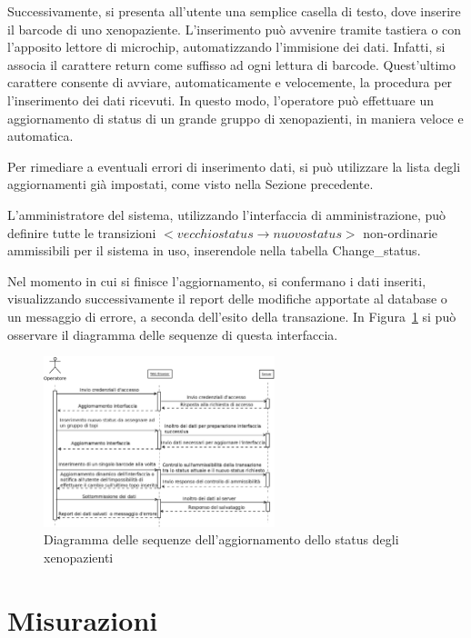 Successivamente, si presenta all'utente una semplice casella di testo, dove inserire il barcode di uno xenopaziente. L'inserimento pu\`o avvenire tramite tastiera o con l'apposito lettore di microchip, automatizzando l'immisione dei dati. Infatti, si associa il carattere return come suffisso ad ogni lettura di barcode. Quest'ultimo carattere consente di avviare, automaticamente e velocemente, la procedura per l'inserimento dei dati ricevuti. In questo modo, l'operatore pu\`o effettuare un aggiornamento di status di un grande gruppo di xenopazienti, in maniera veloce e automatica.

Per rimediare a eventuali errori di inserimento dati, si pu\`o utilizzare la lista degli aggiornamenti gi\`a impostati, come visto nella Sezione precedente.

L'amministratore del sistema, utilizzando l'interfaccia di amministrazione, pu\`o definire tutte le transizioni $<vecchio status \rightarrow nuovo status>$ non-ordinarie ammissibili per il sistema in uso, inserendole nella tabella Change\_status.

Nel momento in cui si finisce l'aggiornamento, si confermano i dati inseriti, visualizzando successivamente il report delle modifiche apportate al database o un messaggio di errore, a seconda dell'esito della transazione. In Figura~\ref{fig:SDcs} si pu\`o osservare il diagramma delle sequenze di questa interfaccia.

\begin{figure}[h]
\begin{center}
\includegraphics[width=0.6\textwidth]{./Figure/SDchangestatus}
\end{center}
\caption{Diagramma delle sequenze dell'aggiornamento dello status degli xenopazienti\label{fig:SDcs}}
\end{figure}

\newpage

\section{Misurazioni}

